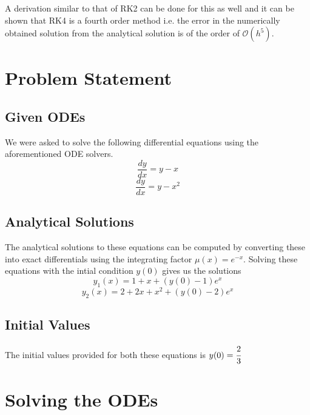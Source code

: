 \documentclass{scrartcl}
\begin{document}
A derivation similar to that of RK2 can be done for this as well and it can be shown that RK4 is a fourth order method i.e. the error in the numerically obtained solution from the analytical solution is of the order of $\mathcal{O}(h^5)$.

\section{Problem Statement}
\subsection{Given ODEs}
We were asked to solve the following differential equations using the aforementioned ODE solvers.
$$\frac{dy}{dx} = y - x$$
$$\frac{dy}{dx} = y - x^2$$

\subsection{Analytical Solutions}
The analytical solutions to these equations can be computed by converting these into exact differentials using the integrating factor $\mu(x) = e^{-x}$. Solving these equations with the intial condition $y(0)$ gives us the solutions
$$y_1(x) = 1 + x + (y(0) - 1)e^x$$
$$y_2(x) = 2 + 2x + x^2 + (y(0) - 2)e^x$$
\subsection{Initial Values}
The initial values provided for both these equations is $y(0) = \cfrac{2}{3}$
\section{Solving the ODEs}
\end{document}
